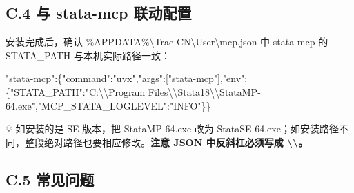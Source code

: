 \documentclass[
  american,
  chinese,
]{ctexart}
\begin{document}
\subsection{\texorpdfstring{\foreignlanguage{american}{C.4 }\foreignlanguage{american}{与}\foreignlanguage{american}{ {stata-mcp} }{\foreignlanguage{american}{联动配置}}}{C.4 与 stata-mcp 联动配置}}\label{c.4-ux4e0e-stata-mcp-ux8054ux52a8ux914dux7f6e}

{\foreignlanguage{american}{安装完成后，确认}}\foreignlanguage{american}{ \%APPDATA\%\textbackslash Trae CN\textbackslash User\textbackslash{}{mcp.json} }\foreignlanguage{american}{中}\foreignlanguage{american}{ {stata-mcp} }\foreignlanguage{american}{的}\foreignlanguage{american}{ STATA\_PATH }{\foreignlanguage{american}{与本机实际路径一致}}\foreignlanguage{american}{：}

\foreignlanguage{american}{"{stata}-mcp{":\{}"command":"uvx","args{":{[}}"stata-mcp"{]},"env{":\{}"STATA\_PATH":"C:\textbackslash\textbackslash Program
Files\textbackslash\textbackslash Stata18\textbackslash\textbackslash StataMP-64.exe","MCP\_STATA\_LOGLEVEL":"INFO"\}\}}

\foreignlanguage{american}{💡 }{\foreignlanguage{american}{如安装的是}}\foreignlanguage{american}{ SE }{\foreignlanguage{american}{版本，把}}\foreignlanguage{american}{ StataMP-64.exe }{\foreignlanguage{american}{改为}}\foreignlanguage{american}{ StataSE-64.exe}\foreignlanguage{american}{；如安装路径不同，整段绝对路径也要相应修改。\textbf{注意}}\textbf{\foreignlanguage{american}{ JSON }}{\textbf{\foreignlanguage{american}{中反斜杠必须写成}}}\textbf{\foreignlanguage{american}{ \textbackslash\textbackslash{}}\foreignlanguage{american}{。}}

\subsection{\texorpdfstring{\foreignlanguage{american}{C.5 }{\foreignlanguage{american}{常见问题}}}{C.5 常见问题}}\label{c.5-ux5e38ux89c1ux95eeux9898}
\end{document}
